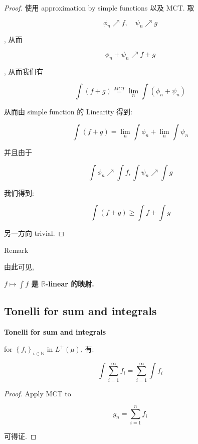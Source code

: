 \documentclass{qlnotes-export}
\begin{document}
\begin{proof}

使用 approximation by simple functions 以及 MCT. 取

\[\phi_{n}\operatorname{\nearrow ︎}f,\quad\psi_{n}\operatorname{\nearrow ︎}g\]

, 从而

\[\phi_{n} + \psi_{n}\operatorname{\nearrow ︎}f + g\]

, 从而我们有

\[\int(f + g)\overset{MCT}{=}\lim\limits_{n}\int(\phi_{n} + \psi_{n})\]

从而由 simple function 的 Linearity 得到:

\[\int(f + g) = \lim\limits_{n}\int\phi_{n} + \lim\limits_{n}\int\psi_{n}\]

并且由于

\[\int\phi_{n}\operatorname{\nearrow ︎}\int f,\int\psi_{n}\operatorname{\nearrow ︎}\int g\]

我们得到:

\[\int(f + g) \geq \int f + \int g\]

另一方向 trivial.

\end{proof}

\begin{qlremark}{Remark}

由此可见,

\textbf{\(f\mapsto\int f\) 是 \(\mathbb{R}\)-linear 的映射.}

\end{qlremark}

\subsection{Tonelli for sum and integrals}\label{tonelli-for-sum-and-integrals}

\begin{corollary}{\protect{}\label{kn-tonelli-for-sum-and-integrals}{\textbf{Tonelli
for sum and integrals}}}

for \(\left\{ f_{i} \right\}_{i \in {\mathbb{N}}}\) in \(L^{+}(\mu)\), 有:

\[\int\sum\limits_{i = 1}^{\infty}f_{i} = \sum\limits_{i = 1}^{\infty}\int f_{i}\]

\end{corollary}

\begin{proof}

Apply MCT to

\[g_{n} = \sum\limits_{i = 1}^{n}f_{i}\]

可得证.

\end{proof}
\end{document}
